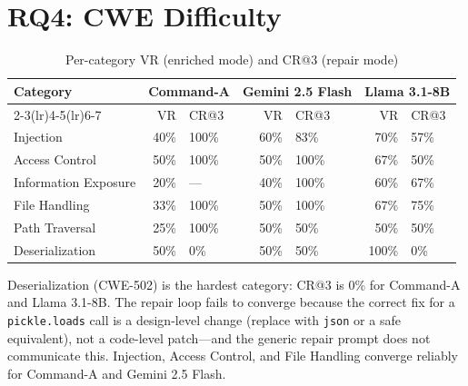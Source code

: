 \documentclass[12pt,a4paper]{report}
\begin{document}
\section{RQ4: CWE Difficulty}
\label{sec:rq4}

\begin{table}[H]
\centering
\caption{Per-category VR (enriched mode) and CR@3 (repair mode)}
\label{tab:category}
\renewcommand{\arraystretch}{1.3}
\begin{tabularx}{\textwidth}{@{}lrXrXrX@{}}
\toprule
\multirow{2}{*}{\textbf{Category}}
  & \multicolumn{2}{c}{\textbf{Command-A}}
  & \multicolumn{2}{c}{\textbf{Gemini 2.5 Flash}}
  & \multicolumn{2}{c}{\textbf{Llama 3.1-8B}} \\
\cmidrule(lr){2-3}\cmidrule(lr){4-5}\cmidrule(lr){6-7}
  & VR & CR@3 & VR & CR@3 & VR & CR@3 \\
\midrule
Injection            & 40\% & 100\% & 60\% &  83\% & 70\% &  57\% \\
Access Control       & 50\% & 100\% & 50\% & 100\% & 67\% &  50\% \\
Information Exposure & 20\% &  ---  & 40\% & 100\% & 60\% &  67\% \\
File Handling        & 33\% & 100\% & 50\% & 100\% & 67\% &  75\% \\
Path Traversal       & 25\% & 100\% & 50\% &  50\% & 50\% &  50\% \\
Deserialization      & 50\% &   0\% & 50\% &  50\% &100\% &   0\% \\
\bottomrule
\end{tabularx}
\end{table}

Deserialization (CWE-502) is the hardest category: CR@3 is 0\% for Command-A and
Llama 3.1-8B. The repair loop fails to converge because the correct fix for a
\texttt{pickle.loads} call is a design-level change (replace with \texttt{json}
or a safe equivalent), not a code-level patch---and the generic repair prompt
does not communicate this. Injection, Access Control, and File Handling converge
reliably for Command-A and Gemini 2.5 Flash.
\end{document}
